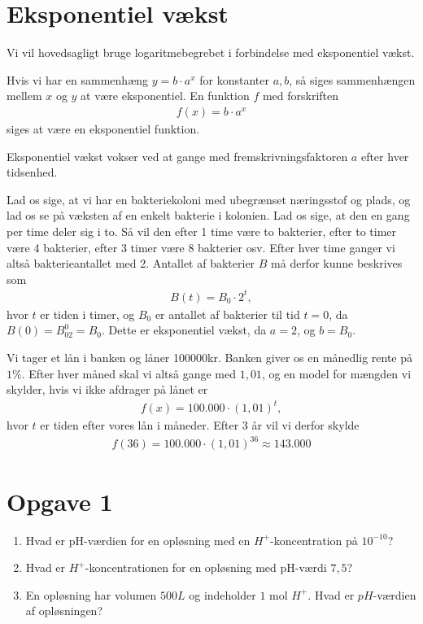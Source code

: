 \section*{Eksponentiel vækst}
Vi vil hovedsagligt bruge logaritmebegrebet i forbindelse med eksponentiel vækst. 
\begin{defn}
Hvis vi har en sammenhæng $y = b\cdot a^x$ for konstanter $a,b$, så siges sammenhængen mellem $x$ og $y$ at være eksponentiel. En funktion $f$ med forskriften
\begin{align*}
f(x) = b\cdot a^x
\end{align*}
siges at være en eksponentiel funktion. 
\end{defn}
Eksponentiel vækst vokser ved at gange med fremskrivningsfaktoren $a$ efter hver tidsenhed.
\begin{exa}
Lad os sige, at vi har en bakteriekoloni med ubegrænset næringsstof og plads, og lad os se på væksten af en enkelt bakterie i kolonien. Lad os sige, at den en gang per time deler sig i to. Så vil den efter 1 time være to bakterier, efter to timer være 4 bakterier, efter 3 timer være 8 bakterier osv. Efter hver time ganger vi altså bakterieantallet med 2. Antallet af bakterier $B$ må derfor kunne beskrives som 
\begin{align*}
B(t) = B_0\cdot 2^t,
\end{align*}
hvor $t$ er tiden i timer, og $B_0$ er antallet af bakterier til tid $t=0$, da $B(0) = B_02^0 = B_0.$
Dette er eksponentiel vækst, da $a = 2$, og $b = B_0$.
\end{exa}
\begin{exa}
Vi tager et lån i banken og låner 100000kr. Banken giver os en månedlig rente på $1\%$. Efter hver måned skal vi altså gange med $1,01$, og en model for mængden vi skylder, hvis vi ikke afdrager på lånet er
\begin{align*}
f(x) = 100.000\cdot (1,01)^t,
\end{align*}
hvor $t$ er tiden efter vores lån i måneder. Efter 3 år vil vi derfor skylde
\begin{align*}
f(36) = 100.000\cdot (1,01)^{36} \approx 143.000
\end{align*}
\end{exa} 



\section*{Opgave 1}
\begin{enumerate}[label=\roman*)]
\item Hvad er pH-værdien for en opløsning med en $H^+$-koncentration på $10^{-10}$?
\item Hvad er $H^+$-koncentrationen for en opløsning med pH-værdi $7,5$?
\item En opløsning har volumen $500L$ og indeholder $1$ mol $H^+$. Hvad er $pH$-værdien af opløsningen?
\end{enumerate}
